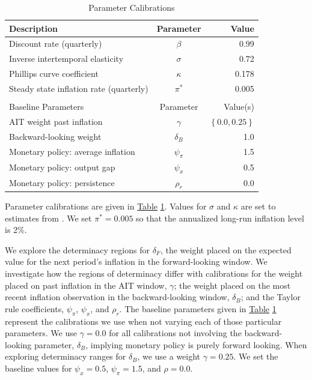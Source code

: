 \documentclass[english,authoryear,12pt]{elsarticle}
\begin{document}
\begin{table}[htp]
	\captionsetup{justification=centering}
	\caption{Parameter Calibrations}\label{tb:parms}
	\begin{center}
		\vspace*{-1pc}\begin{tabular}{lcr}
			Description & Parameter & Value \\ \hline
			Discount rate (quarterly) & $\beta$ & 0.99 \\
			Inverse intertemporal elasticity & $\sigma$ & 0.72 \\
			Phillips curve coefficient & $\kappa$ & 0.178 \\
			Steady state inflation rate (quarterly) & $\pi^*$ & 0.005 \\ [0.25pc]
			\hline \\ [-0.25pc]
			Baseline Parameters & Parameter & Value(s) \\ \hline
			AIT weight past inflation & $\gamma$ & $\left\{ 0.0, 0.25 \right\}$ \\
			Backward-looking weight & $\delta_B$ & 1.0 \\
			Monetary policy: average inflation & $\psi_\pi$ & 1.5 \\
			Monetary policy: output gap & $\psi_x$ & 0.5 \\
			Monetary policy: persistence & $\rho_r$ & 0.0 \\ \hline
		\end{tabular}
	\end{center}
\end{table}

Parameter calibrations are given in \href{tb:parms}{Table} \ref{tb:parms}. Values for $\sigma$ and $\kappa$ are set to estimates from \citet{smetswouters2007}. We set $\pi^*=0.005$ so that the annualized long-run inflation level is 2\%.

We explore the determinacy regions for $\delta_F$, the weight placed on the expected value for the next period's inflation in the forward-looking window. We investigate how the regions of determinacy differ with calibrations for the weight placed on past inflation in the AIT window, $\gamma$; the weight placed on the most recent inflation observation in the backward-looking window, $\delta_B$; and the Taylor rule coefficients, $\psi_\pi$, $\psi_x$, and $\rho_r$. The baseline parameters given in \href{tb:parms}{Table} \ref{tb:parms} represent the calibrations we use when not varying each of those particular parameters. We use $\gamma=0.0$ for all calibrations not involving the backward-looking parameter, $\delta_B$, implying monetary policy is purely forward looking. When exploring determinacy ranges for $\delta_B$, we use a weight $\gamma=0.25$. We set the baseline values for $\psi_x=0.5$, $\psi_\pi = 1.5$, and $\rho=0.0$.
\end{document}
